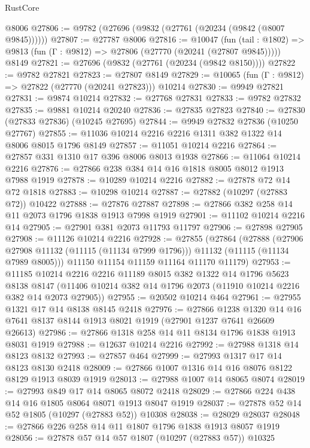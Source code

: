 \begin{lexlean}{RustCore}
\begin{coremodule}
    @8006
@27806 := @9782 (@27696 (@9832 (@27761 (@20234 (@9842 (@8007 @9845))))))
@27807 := @27787 @8006
@27816 := @10047
    (fun (tail : @1802) => @9813 (fun (Γ : @9812) => @27806 (@27770 (@20241 (@27807 @9845)))))
    @8149
@27821 := @27696 (@9832 (@27761 (@20234 (@9842 @8150))))
@27822 := @9782 @27821
@27823 := @27807 @8149
@27829 := @10065 (fun (Γ : @9812) => @27822 (@27770 (@20241 @27823))) @10214
@27830 := @9949 @27821
@27831 := @9874 @10214
@27832 := @27768 @27831
@27833 := @9782 @27832
@27835 := @9881 @10214 @20240
@27836 := @27835 @27823
@27840 := @27830 (@27833 @27836) (@10245 @27695)
@27844 := @9949 @27832 @27836 (@10250 @27767)
@27855 := @11036 @10214 @2216 @2216 @1311 @382 @1322 @14 @8006 @8015 @1796 @8149
@27857 := @11051 @10214 @2216
@27864 := @27857 @331 @1310 @17 @396 @8006 @8013 @1938
@27866 := @11064 @10214 @2216
@27876 := @27866 @238 @384 @14 @16 @1818 @8005 @8012 @1913 @7988 @1919
@27878 := @10289 @10214 @2216
@27882 := @27878 @72 @14 @72 @1818
@27883 := @10298 @10214
@27887 := @27882 (@10297 (@27883 @72)) @10422
@27888 := @27876 @27887
@27898 := @27866 @382 @258 @14 @11 @2073 @1796 @1838 @1913 @7998 @1919
@27901 := @11102 @10214 @2216 @14
@27905 := @27901 @381 @2073 @11793 @11797
@27906 := @27898 @27905
@27908 := @11126 @10214 @2216
@27928 := @27855
    (@27864
      (@27888
        (@27906 @27908 @11132 (@11115 (@11134 @7999 @1796)))
        @11132
        (@11115 (@11134 @7989 @8005)))
      @11150
      @11154
      @11159
      @11164
      @11170
      @11179)
@27953 := @11185
    @10214
    @2216
    @2216
    @11189
    @8015
    @382
    @1322
    @14
    @1796
    @5623
    @8138
    @8147
    (@11406 @10214 @382 @14 @1796 @2073 (@11910 @10214 @2216 @382 @14 @2073 @27905))
@27955 := @20502 @10214 @464
@27961 := @27955 @1321 @17 @14 @8138 @8145 @2418
@27976 := @27866
    @1238
    @1320
    @14
    @16
    @7641
    @8137
    @8144
    @1913
    @8021
    @1919
    (@27901 @1237 @7641 @26609 @26613)
@27986 := @27866 @1318 @258 @14 @11 @8134 @1796 @1838 @1913 @8031 @1919
@27988 := @12637 @10214 @2216
@27992 := @27988 @1318 @14 @8123 @8132
@27993 := @27857 @464
@27999 := @27993 @1317 @17 @14 @8123 @8130 @2418
@28009 := @27866 @1007 @1316 @14 @16 @8076 @8122 @8129 @1913 @8039 @1919
@28013 := @27988 @1007 @14 @8065 @8074
@28019 := @27993 @849 @17 @14 @8065 @8072 @2418
@28029 := @27866 @224 @438 @14 @16 @1805 @8064 @8071 @1913 @8047 @1919
@28037 := @27878 @52 @14 @52 @1805 (@10297 (@27883 @52)) @10308
@28038 := @28029 @28037
@28048 := @27866 @226 @258 @14 @11 @1807 @1796 @1838 @1913 @8057 @1919
@28056 := @27878 @57 @14 @57 @1807 (@10297 (@27883 @57)) @10325

\end{coremodule}
\end{lexlean}
